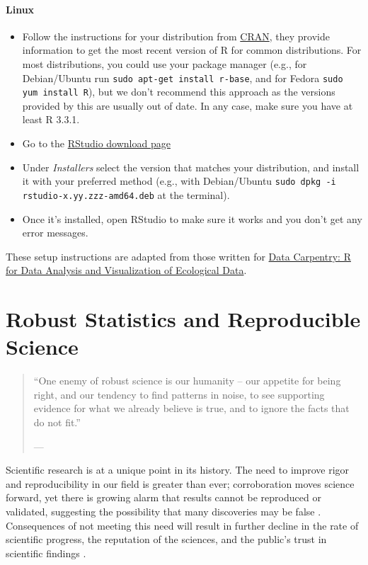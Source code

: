 \documentclass[
  12pt, krantz2,
]{krantz}
\newcommand{\passthrough}[1]{#1}
\providecommand{\tightlist}{%
  \setlength{\itemsep}{0pt}\setlength{\parskip}{0pt}}
\newcommand{\1}{\mathbbm{1}}
\theoremstyle{definition}
\theoremstyle{definition}
\theoremstyle{definition}
\theoremstyle{definition}
\theoremstyle{remark}
\begin{document}
\hypertarget{linux}{%
\subsubsection{Linux}\label{linux}}

\begin{itemize}
\tightlist
\item
  Follow the instructions for your distribution
  from \href{https://cloud.r-project.org/bin/linux}{CRAN}, they provide information
  to get the most recent version of R for common distributions. For most
  distributions, you could use your package manager (e.g., for Debian/Ubuntu run
  \passthrough{\lstinline!sudo apt-get install r-base!}, and for Fedora \passthrough{\lstinline!sudo yum install R!}), but we
  don't recommend this approach as the versions provided by this are
  usually out of date. In any case, make sure you have at least R 3.3.1.
\item
  Go to the \href{https://www.rstudio.com/products/rstudio/download/\#download}{RStudio download
  page}
\item
  Under \emph{Installers} select the version that matches your distribution, and
  install it with your preferred method (e.g., with Debian/Ubuntu \passthrough{\lstinline!sudo dpkg -i rstudio-x.yy.zzz-amd64.deb!} at the terminal).
\item
  Once it's installed, open RStudio to make sure it works and you don't get any
  error messages.
\end{itemize}

These setup instructions are adapted from those written for \href{http://www.datacarpentry.org/R-ecology-lesson/}{Data Carpentry: R
for Data Analysis and Visualization of Ecological
Data}.

\hypertarget{robust}{%
\chapter{Robust Statistics and Reproducible Science}\label{robust}}

\begin{quote}
``One enemy of robust science is our humanity -- our appetite for
being right, and our tendency to find patterns in noise, to see supporting
evidence for what we already believe is true, and to ignore the facts that do
not fit.''

--- \citet{naturenews_2015}
\end{quote}

Scientific research is at a unique point in its history. The need to improve
rigor and reproducibility in our field is greater than ever; corroboration moves
science forward, yet there is growing alarm that results cannot be reproduced or
validated, suggesting the possibility that many discoveries may be false
\citep{baker2016there}. Consequences of not meeting this need will result in further
decline in the rate of scientific progress, the reputation of the sciences, and
the public's trust in scientific findings \citep{munafo2017manifesto, naturenews2_2015}.
\end{document}
